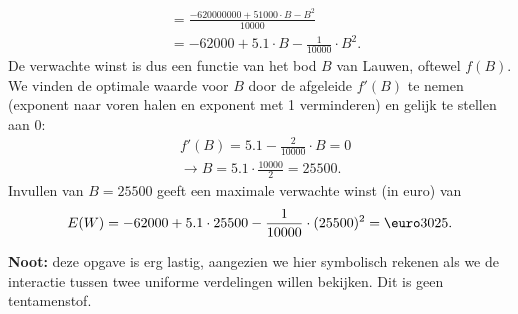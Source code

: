 \begin{enumerate}[label=(\alph*)]
{\begin{align*}
                        &= \frac{-620 000 000 + 51 000\cdot B-B^2}{10 000} \\
                        &= -62 000 + 5.1\cdot B-\frac{1}{10000}\cdot B^2.
            \end{align*}
            De verwachte winst is dus een functie van het bod $B$ van Lauwen, oftewel $f(B)$.
            We vinden de optimale waarde voor $B$ door de afgeleide $f'(B)$ te nemen (exponent naar voren halen en exponent met 1 verminderen) en gelijk te stellen aan $0$:
            \begin{align*}
                &f'(B) = 5.1 - \frac{2}{10000}\cdot B = 0 \\
                &\rightarrow B = 5.1 \cdot \frac{10 000}{2} = 25 500.
            \end{align*}
            Invullen van $B = 25 500$ geeft een maximale verwachte winst (in euro) van 
            \[
                E(W) = -62 000 + 5.1\cdot 25 500-\frac{1}{10000}\cdot (25 500)^2 = \text{\euro} 3 025.
            \]

            {\bfseries Noot:} deze opgave is erg lastig, aangezien we hier symbolisch rekenen als we de interactie tussen twee uniforme verdelingen willen bekijken.
            Dit is geen tentamenstof.
    }


\end{enumerate}
